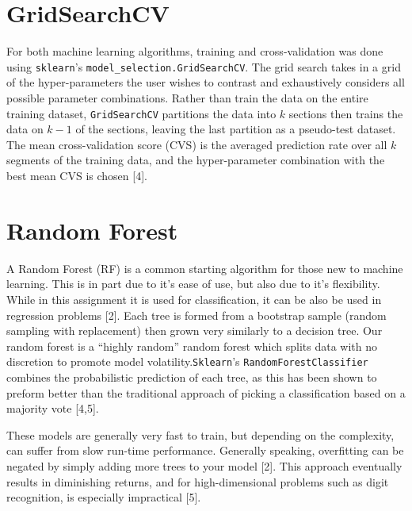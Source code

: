 \documentclass{article}
\begin{document}
\section{GridSearchCV}
For both machine learning algorithms, training and cross-validation was done using \verb+sklearn+'s \verb+model_selection.GridSearchCV+. The grid search takes in a grid of the hyper-parameters the user wishes to contrast and exhaustively considers all possible parameter combinations. Rather than train the data on the entire training dataset, \verb+GridSearchCV+ partitions the data into $k$ sections then trains the data on $k-1$ of the sections, leaving the last partition as a pseudo-test dataset. The mean cross-validation score (CVS) is the averaged prediction rate over all $k$ segments of the training data, and the hyper-parameter combination with the best mean CVS is chosen [4].

\section{Random Forest}
A Random Forest (RF) is a common starting algorithm for those new to machine learning. This is in part due to it's ease of use, but also due to it's flexibility. While in this assignment it is used for classification, it can be also be used in regression problems [2]. Each tree is formed from a bootstrap sample (random sampling with replacement) then grown very similarly to a decision tree. Our random forest is a ``highly random'' random forest which splits data with no discretion to promote model volatility.\verb+Sklearn+'s \verb+RandomForestClassifier+ combines the probabilistic prediction of each tree, as this has been shown to preform better than the traditional approach of picking a classification based on a majority vote [4,5].

These models are generally very fast to train, but depending on the complexity, can suffer from slow run-time performance. Generally speaking, overfitting can be negated by simply adding more trees to your model [2]. This approach eventually results in diminishing returns, and for high-dimensional problems such as digit recognition, is especially impractical [5].
\end{document}
